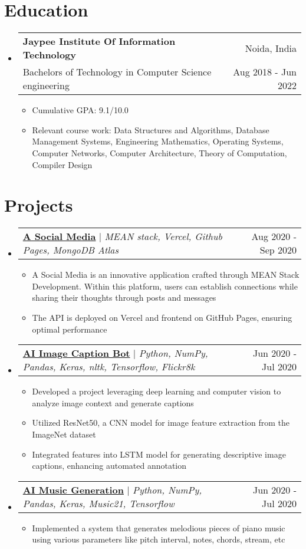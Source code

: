\documentclass[letterpaper,13pt]{article}
\makeatletter
\newcommand{\resumeItem}[1]{
  \item\small{
    {#1 \vspace{-2pt}}
  }
}
\newcommand{\resumeSubheading}[4]{
  \vspace{-2pt}\item
    \begin{tabular*}{0.97\textwidth}[t]{l@{\extracolsep{\fill}}r}
      \textbf{#1} & #2 \\
      #3 & \small{#4} \\
    \end{tabular*}\vspace{-7pt}
}
\newcommand{\resumeProjectHeading}[2]{
    \item
    \begin{tabular*}{0.97\textwidth}{l@{\extracolsep{\fill}}r}
      \small#1 & #2 \\
    \end{tabular*}\vspace{-7pt}
}
\newcommand{\resumeItemListStart}{\begin{itemize}}
\newcommand{\resumeItemListEnd}{\end{itemize}\vspace{-5pt}}
\makeatother
\begin{document}
\section{Education}
  \begin{itemize}[leftmargin=*, label={}]
    \resumeSubheading
      {Jaypee Institute Of Information Technology}{Noida, India}
      {Bachelors of Technology in Computer Science engineering}{Aug 2018 - Jun 2022}
      \resumeItemListStart
      \resumeItem{Cumulative GPA: 9.1/10.0}
      \resumeItem{Relevant course work: Data Structures and Algorithms, Database Management Systems, Engineering Mathematics, Operating Systems, Computer Networks, Computer Architecture, Theory of Computation, Compiler Design}
      \resumeItemListEnd
  \end{itemize}

\section{Projects}
    \begin{itemize}[leftmargin=*, label={}]
      \resumeProjectHeading
          {\href{https://github.com/JayantGoel001/A-Social-Media}{\textbf{A Social Media}} $|$ \emph{MEAN stack, Vercel, Github Pages, MongoDB Atlas}}{Aug 2020 - Sep 2020}
          \resumeItemListStart
            \resumeItem{A Social Media is an innovative application crafted through MEAN Stack Development. Within this platform, users can establish connections while sharing their thoughts through posts and messages}
            \resumeItem{The API is deployed on Vercel and frontend on GitHub Pages, ensuring optimal performance}
          \resumeItemListEnd
      \resumeProjectHeading
          {\href{https://github.com/JayantGoel001/AI-Image-Caption-Bot}{\textbf{AI Image Caption Bot}} $|$ \emph{Python, NumPy, Pandas, Keras, nltk, Tensorflow, Flickr8k}}{Jun 2020 - Jul 2020}
          \resumeItemListStart
            \resumeItem{Developed a project leveraging deep learning and computer vision to analyze image context and generate captions}
            \resumeItem{Utilized ResNet50, a CNN model for image feature extraction from the ImageNet dataset}
            \resumeItem{Integrated features into LSTM model for generating descriptive image captions, enhancing automated annotation}
          \resumeItemListEnd
      \resumeProjectHeading
          {\href{https://github.com/JayantGoel001/AI-Music-Generation}{\textbf{AI Music Generation}} $|$ \emph{Python, NumPy, Pandas, Keras, Music21, Tensorflow}}{Jun 2020 - Jul 2020}
          \resumeItemListStart
            \resumeItem{Implemented a system that generates melodious pieces of piano music using various parameters like pitch interval, notes, chords, stream, etc}
          \resumeItemListEnd
    \end{itemize}
\end{document}
